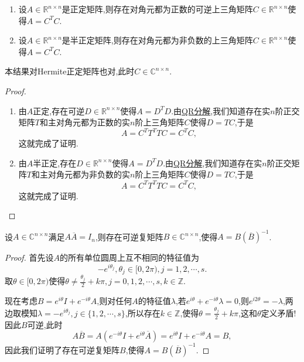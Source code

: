\documentclass[../../main.tex]{subfiles}
\begin{document}
\begin{theorem}[正定矩阵分解为上三角]\label{theorem:正定矩阵分解为上三角}
\begin{enumerate}
\item 设\( A \in \mathbb{R}^{n \times n} \)是正定矩阵,则存在对角元都为正数的可逆上三角矩阵\( C \in \mathbb{R}^{n \times n} \)使得\( A = C^T C \).

\item 设\( A \in \mathbb{R}^{n \times n} \)是半正定矩阵,则存在对角元都为非负数的上三角矩阵\( C \in \mathbb{R}^{n \times n} \)使得\( A = C^T C \).
\end{enumerate}
\end{theorem}
\begin{note}
本结果对Hermite正定矩阵也对,此时\( C \in \mathbb{C}^{n \times n} \).
\end{note}
\begin{proof}
\begin{enumerate}
\item 由\( A \)正定,存在可逆\( D \in \mathbb{R}^{n \times n} \)使得\( A = D^T D \).由\hyperref[theorem:施密特正交化对应的矩阵分解,QR分解]{QR分解},我们知道存在实\( n \)阶正交矩阵\( T \)和主对角元都为正数的实\( n \)阶上三角矩阵\( C \)使得\( D = TC \),于是
\[
A = C^T T^T T C = C^T C,
\]
这就完成了证明.

\item 由\( A \)半正定,存在\( D \in \mathbb{R}^{n \times n} \)使得\( A = D^T D \).由\hyperref[theorem:施密特正交化对应的矩阵分解,QR分解]{QR分解},我们知道存在实\( n \)阶正交矩阵\( T \)和主对角元都为非负数的实\( n \)阶上三角矩阵\( C \)使得\( D = TC \),于是
\[
A = C^T T^T T C = C^T C,
\]
这就完成了证明.
\end{enumerate}

\end{proof}

\begin{theorem}\label{theorem:定理1354846135}
设\( A \in \mathbb{C}^{n \times n} \)满足\( A \overline{A} = I_n \),则存在可逆复矩阵\( B \in \mathbb{C}^{n \times n} \),使得\( A = B (\overline{B})^{-1} \).
\end{theorem}
\begin{proof}
首先设\( A \)的所有单位圆周上互不相同的特征值为
\[
-e^{i\theta_j}, \theta_j \in [0, 2\pi), j = 1, 2, \cdots, s.
\]
取\( \theta \in [0, 2\pi) \)使得\( \theta \neq \frac{\theta_j}{2} + k\pi, j = 0, 1, 2, \cdots, s, k \in \mathbb{Z} \).

现在考虑\( B = e^{i\theta} I + e^{-i\theta} A \),则对任何\( A \)的特征值\( \lambda \),若\( e^{i\theta} + e^{-i\theta} \lambda = 0 \),则\( e^{i2\theta} = -\lambda \),两边取模知\( \lambda = -e^{i\theta_j}, j \in \{1, 2, \cdots, s\} \),所以存在\( k \in \mathbb{Z} \),使得\( \theta = \frac{\theta_j}{2} + k\pi \),这和\( \theta \)定义矛盾!因此\( B \)可逆,此时
\[
A \overline{B} = A \left( e^{-i\theta} I + e^{i\theta} \overline{A} \right) = e^{i\theta} I + e^{-i\theta} A = B,
\]
因此我们证明了存在可逆复矩阵\( B \),使得\( A = B (\overline{B})^{-1} \).

\end{proof}
\end{document}
